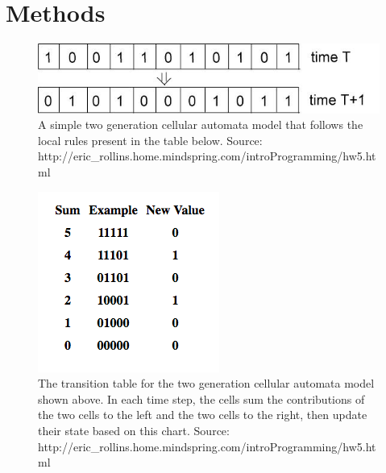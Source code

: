 \documentclass{article}
\begin{document}
\pagebreak
\section*{Methods}
\begin{figure} [htbp] \centering
 \includegraphics[scale=0.70]{figures/SimpleCA_2Gen.jpg}
 \caption{A simple two generation cellular automata model that follows the local rules present in the table below. Source: http://eric\_rollins.home.mindspring.com/introProgramming/hw5.html}
\end{figure}

\begin{figure} [htbp] \centering
 \includegraphics[scale=0.80]{figures/SimpleCA_TransTable}
 \caption{The transition table for the two generation cellular automata model shown above. In each time step, the cells sum the contributions of the two cells to the left and the two cells to the right, then update their state based on this chart. Source: http://eric\_rollins.home.mindspring.com/introProgramming/hw5.html}
\end{figure}
\end{document}
